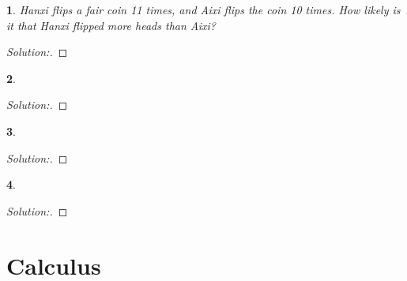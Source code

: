 \documentclass[10pt]{report}
\newtheorem{exe}{}[chapter]
\newenvironment{sol}{\begin{proof}[Solution:]}{\end{proof}}
\begin{document}
\begin{exe}
Hanxi flips a fair coin 11 times, and Aixi flips the coin 10 times. How likely is it that Hanxi flipped more heads than Aixi?
\end{exe}
\begin{teacher}
\begin{sol}
\end{sol}
\end{teacher}

\begin{exe}
\end{exe}
\begin{teacher}
\begin{sol}
\end{sol}
\end{teacher}
\begin{exe}
\end{exe}
\begin{teacher}
\begin{sol}
\end{sol}
\end{teacher}





































\begin{exe}

\end{exe}
\begin{teacher}
\begin{sol}
\end{sol}
\end{teacher}



\chapter{Calculus}
\end{document}
